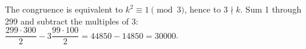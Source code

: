 The congruence is equivalent to $ k^2\equiv1\pmod3 $, hence to $ 3\nmid k $. Sum 1 through 299 and subtract the multiples of 3: $\dfrac{299\cdot300}{2}-3\dfrac{99\cdot100}{2}=44850-14850=\boxed{30000}$.
